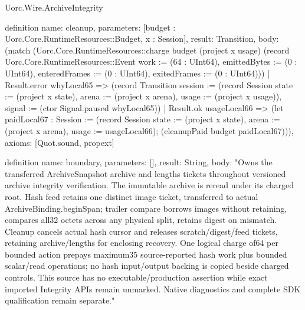 \begin{lexlean}{Uorc.Wire.ArchiveIntegrity}
\begin{semanticmodule}
definition{
  name: cleanup,
  parameters: [budget : Uorc.Core.RuntimeResources::Budget, x : Session],
  result: Transition,
  body: (match (Uorc.Core.RuntimeResources::charge budget (project x usage) (record Uorc.Core.RuntimeResources::Event {work := (64 : UInt64), emittedBytes := (0 : UInt64), enteredFrames := (0 : UInt64), exitedFrames := (0 : UInt64)}))
    | Result.error whyLocal65 => (record Transition {session := (record Session {state := (project x state), arena := (project x arena), usage := (project x usage)}), signal := (ctor Signal.paused whyLocal65)})
    | Result.ok usageLocal66 => (let paidLocal67 : Session := (record Session {state := (project x state), arena := (project x arena), usage := usageLocal66}); (cleanupPaid budget paidLocal67))),
  axioms: [Quot.sound, propext]
}

definition{
  name: boundary,
  parameters: [],
  result: String,
  body: "Owns the transferred ArchiveSnapshot archive and lengths tickets throughout versioned archive integrity verification. The immutable archive is reread under its charged root. Hash feed retains one distinct image ticket, transferred to actual ArchiveBinding.beginSpan; trailer compare borrows images without retaining, compares all32 octets across any physical split, retains digest on mismatch. Cleanup cancels actual hash cursor and releases scratch/digest/feed tickets, retaining archive/lengths for enclosing recovery. One logical charge of64 per bounded action prepays maximum35 source-reported hash work plus bounded scalar/read operations; no hash input/output backing is copied beside charged controls. This source has no executable/production assertion while exact imported Integrity APIs remain unmarked. Native diagnostics and complete SDK qualification remain separate."
}
\end{semanticmodule}
\end{lexlean}
